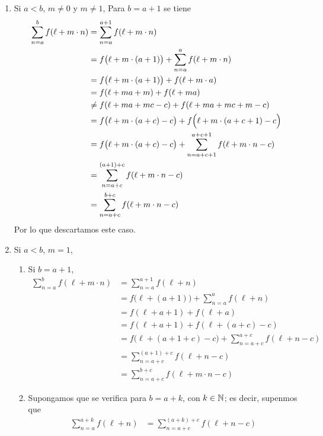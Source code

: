 \begin{enumerate}[label=\alph*)]
\begin{enumerate}[label=\Roman*)]
    \item Si $a<b$, $m\neq 0$ y $m\neq 1$,
    Para $b=a+1$ se tiene
    \begin{align*}
      \sum_{n=a}^b f(\ell+m\cdot n) &=\sum_{n=a}^{a+1} f(\ell+m\cdot n)\\
      &= f\bigl(\ell+m\cdot (a+1)\bigr) + \sum_{n=a}^{a} f(\ell+m\cdot n)\\
      &= f\bigl(\ell+m\cdot (a+1)\bigr) + f(\ell+m\cdot a)\\
      &= f(\ell+ma+m) + f(\ell+ma)\\
      &\neq f(\ell+ma+mc-c) + f(\ell+ma+mc+m-c)\\
      &= f\bigl(\ell+m\cdot (a+c)-c\bigr) + f\Bigl(\ell +m\cdot (a+c+1)-c\Bigr)\\
      &= f\bigl(\ell+m\cdot (a+c)-c\bigr) + \sum_{n=a+c+1}^{a+c+1} f(\ell+m\cdot n-c)\\
      &= \sum_{n=a+c}^{(a+1)+c} f(\ell+m\cdot n-c)\\
      &= \sum_{n=a+c}^{b+c} f(\ell+m\cdot n-c)
    \end{align*}
    Por lo que descartamos este caso.

    \item Si $a<b$, $m=1$,
    \begin{enumerate}[label=\roman*)]
      \item Si $b=a+1$,
      \begin{align*}
        \sum_{n=a}^b f(\ell+m\cdot n) &=\sum_{n=a}^{a+1} f(\ell+n)\\
        &= f\bigl(\ell+ (a+1)\bigr) + \sum_{n=a}^{a} f(\ell+ n)\\
        &= f(\ell+a+1) + f(\ell+a)\\
        &= f(\ell+a+1) + f(\ell +(a+c)-c)\\
        &= f\bigl(\ell+(a+1+c)-c\bigr) + \sum_{n=a+c}^{a+c} f(\ell+ n-c)\\
        &= \sum_{n=a+c}^{(a+1)+c} f(\ell+n-c)\\
        &= \sum_{n=a+c}^{b+c} f(\ell+m\cdot n-c)
      \end{align*}

      \item Supongamos que se verifica para $b=a+k$, con $k\in \mathbb{N}$; es decir, supenmos que
      \begin{align*}
        \sum_{n=a}^{a+k} f(\ell+n) &= \sum_{n=a+c}^{(a+k)+c} f(\ell+n-c)
      \end{align*}


\end{enumerate}
\end{enumerate}
\end{enumerate}
